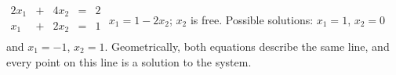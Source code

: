 {$\begin{array}{ccccc}
2x_1&+&4x_2&=&2\\
x_1&+&2x_2&=&1\\
\end{array}$}
{$x_1=1-2x_2$; $x_2$ is free. Possible solutions: $x_1=1$, $x_2=0$ and $x_1=-1$, $x_2=1$. Geometrically, both equations describe the same line, and every point on this line is a solution to the system.}